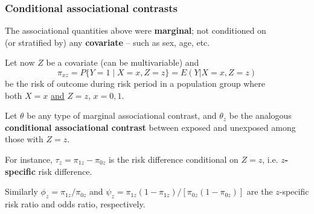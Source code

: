 \documentclass[12pt,dvipsnames,t,aspectratio=169, handout%
]{beamer}
\begin{document}
\begin{frame}
\frametitle{\large Conditional associational contrasts}

\bi
\item
The associational quantities above were \textbf{marginal}; 
not conditioned on \\ (or stratified by) any \textbf{covariate} -- such as sex, age, etc.
\medskip
\item
Let now $Z$ be a covariate (can be multivariable)  and
$$ \pi_{xz} = P\{ Y=1 \mid  X=x, Z=z \} = E(Y|X=x, Z=z) $$  
be the risk of outcome during risk period in a population group where \\ both $X=x$ \underline{and} $Z=z$, $x=0,1$.
\medskip
\item
Let $\theta$ be any type of marginal associational contrast, and $\theta_z$ 
be the analogous {\bf conditional associational contrast} 
between exposed and unexposed among those with $Z=z$.
\medskip
\item
For instance, $ \tau_z = \pi_{1z} - \pi_{0z}$ is the risk difference conditional on $Z=z$, i.e. {\bf $z$-specific} risk difference. 
\medskip
\item
Similarly $\phi_z = \pi_{1z}/\pi_{0z}$ and $\psi_z = \pi_{1z}(1-\pi_{1z})/[\pi_{0z}(1 - \pi_{0z})]$ are the  $z$-specific risk ratio and odds ratio, respectively.

\ei 
\end{frame}
\end{document}

